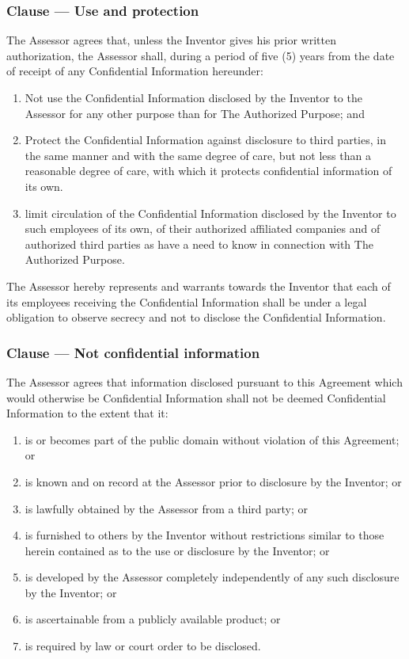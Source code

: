 \documentclass[a4paper]{article}
\newcounter{clausenr}
\newcommand{\clause}[1]{\addtocounter{clausenr}{1}\subsubsection{Clause \Roman{clausenr} --- #1}}
\begin{document}
\clause{Use and protection}
The Assessor agrees that,
unless the Inventor gives his prior written authorization,
the Assessor shall,
during a period of five (5) years from the date of receipt of any Confidential Information hereunder:
\begin{enumerate}
\item Not use the Confidential Information disclosed by the Inventor to the Assessor for any other purpose than for The Authorized Purpose; and
\item Protect the Confidential Information against disclosure to third parties,
in the same manner and with the same degree of care,
but not less than a reasonable degree of care,
with which it protects confidential information of its own.
\item limit circulation of the Confidential Information disclosed by the Inventor to such employees of its own,
of their authorized affiliated companies and of authorized third parties as have a need to know in connection with The Authorized Purpose.
\end{enumerate}
The Assessor hereby represents and warrants towards the Inventor that each of its employees
receiving the Confidential Information shall be under a legal obligation to observe secrecy and not to
disclose the Confidential Information.

\clause{Not confidential information}
The Assessor agrees that information disclosed pursuant to this Agreement which would otherwise be
Confidential Information shall not be deemed Confidential Information to the extent that it:
\begin{enumerate}
\item is or becomes part of the public domain without violation of this Agreement; or
\item is known and on record at the Assessor prior to disclosure by the Inventor; or
\item is lawfully obtained by the Assessor from a third party; or
\item is furnished to others by the Inventor without restrictions similar to those herein contained as to the use or disclosure by the Inventor; or
\item is developed by the Assessor completely independently of any such disclosure by the Inventor; or
\item is ascertainable from a publicly available product; or
\item is required by law or court order to be disclosed.
\end{enumerate}
\end{document}
